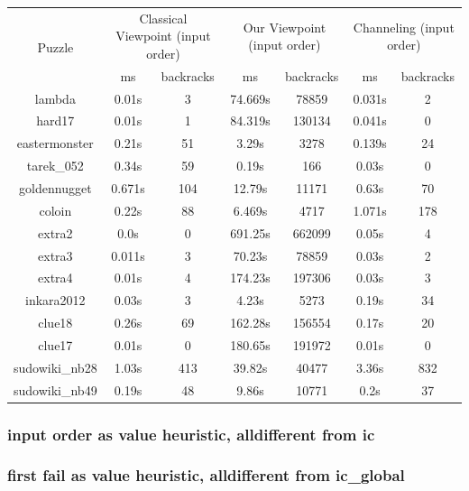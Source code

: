 \documentclass{report}
\begin{document}
\begin{table}[h!]
  \begin{tabular}{|c|c|c|c|c|c|c|}
    \hline
    \multirow{2}{*}{Puzzle} &
      \multicolumn{2}{L|}{Classical Viewpoint (input order)} &
      \multicolumn{2}{L|}{Our Viewpoint (input order)} &
      \multicolumn{2}{L|}{ Channeling (input order)} \\
    & ms & backracks & ms & backracks & ms & backracks \\
    \hline
lambda & 0.01s & 3 & 74.669s & 78859 & 0.031s & 2\\
hard17 & 0.01s & 1 & 84.319s & 130134 & 0.041s & 0\\
eastermonster & 0.21s & 51 & 3.29s & 3278 & 0.139s & 24\\
tarek\_052 & 0.34s & 59 & 0.19s & 166 & 0.03s & 0\\
goldennugget & 0.671s & 104 & 12.79s & 11171 & 0.63s & 70\\
coloin & 0.22s & 88 & 6.469s & 4717 & 1.071s & 178\\
extra2 & 0.0s & 0 & 691.25s & 662099 & 0.05s & 4\\
extra3 & 0.011s & 3 & 70.23s & 78859 & 0.03s & 2\\
extra4 & 0.01s & 4 & 174.23s & 197306 & 0.03s & 3\\
inkara2012 & 0.03s & 3 & 4.23s & 5273 & 0.19s & 34\\
clue18 & 0.26s & 69 & 162.28s & 156554 & 0.17s & 20\\
clue17 & 0.01s & 0 & 180.65s & 191972 & 0.01s & 0\\
sudowiki\_nb28 & 1.03s & 413 & 39.82s & 40477 & 3.36s & 832\\
sudowiki\_nb49 & 0.19s & 48 & 9.86s & 10771 & 0.2s & 37\\
 \hline
  \end{tabular}
\end{table}

\subsubsection{input order as value heuristic, alldifferent from ic}


\newpage
\subsubsection{first fail as value heuristic, alldifferent from ic\_global}
\end{document}
